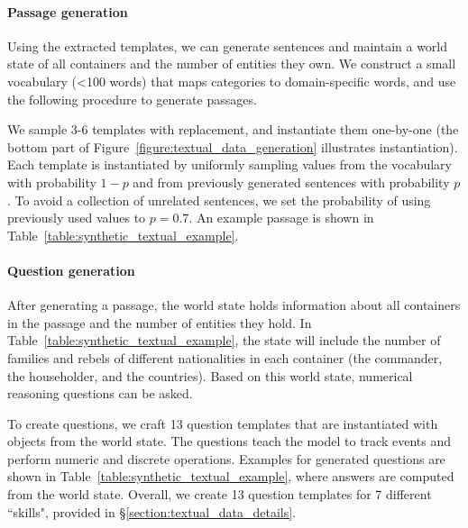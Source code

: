 \documentclass[11pt,a4paper]{article}
\begin{document}
\paragraph{Passage generation}
Using the extracted templates, we can generate sentences and maintain a world state of all containers and the number of entities they own. 
We construct a small vocabulary (<100 words) that maps categories to domain-specific words, and use the following procedure to generate passages.

We sample 3-6 templates with replacement, and instantiate them one-by-one (the bottom part of Figure~\ref{figure:textual_data_generation} illustrates instantiation).
Each template is instantiated by uniformly sampling values from the vocabulary with probability $1-p$ and from previously generated sentences with probability $p$. 
To avoid a collection of unrelated sentences, we set the probability of using previously used values to $p=0.7$.
An example passage is shown in Table~\ref{table:synthetic_textual_example}. 

\paragraph{Question generation}
After generating a passage, the world state holds information about all containers in the passage and the number of entities they hold. In Table~\ref{table:synthetic_textual_example}, the state will include the number of families and rebels of different nationalities in each container (the commander, the householder, and the countries).
Based on this world state, numerical reasoning questions can be asked.

To create questions, we craft 13 question templates that are instantiated with objects from the world state. The questions teach the model to track events and perform numeric and discrete operations. Examples for generated questions are shown in Table~\ref{table:synthetic_textual_example}, where answers are computed from the world state.
Overall, we create 13 question templates for 7 different ``skills", provided in \S\ref{section:textual_data_details}.
\end{document}
